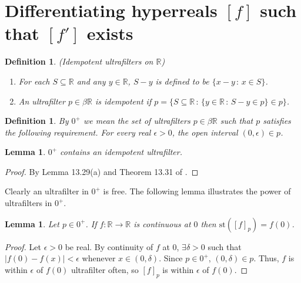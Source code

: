 \documentclass[microtype]{jloganal}
\newtheorem{lemma}[theorem]{Lemma}
\newtheorem{definition}[theorem]{Definition}
\begin{document}
\section{Differentiating hyperreals $[f]$ such that $[f']$ exists}
\label{mainsection}

\begin{definition}
\label{idempotentultrafiltersonRdefn}
(Idempotent ultrafilters on $\mathbb R$)
    \begin{enumerate}
        \item
        For each $S\subseteq \mathbb R$ and any $y\in\mathbb R$,
        $S-y$ is defined to be $\{x-y\,:\,x\in S\}$.
        \item
        An ultrafilter $p\in\beta\mathbb R$ is \emph{idempotent} if
        $p=\{S\subseteq \mathbb R \,:\, \{y\in\mathbb R\,:\,S-y\in p\}\in p\}$.
    \end{enumerate}
\end{definition}

\begin{definition}
    By $0^+$ we mean the set of ultrafilters $p\in\beta\mathbb R$
    such that $p$ satisfies the following requirement.
    For every real $\epsilon>0$, the open interval $(0,\epsilon)\in p$.
\end{definition}

\begin{lemma}
\label{zeroplushasidempotentultrafilterlemma}
    $0^+$ contains an idempotent ultrafilter.
\end{lemma}

\begin{proof}
    By Lemma 13.29(a) and Theorem 13.31 of \cite{hindman2011algebra}.
\end{proof}

Clearly an ultrafilter in $0^+$ is free.
The following lemma illustrates the power of ultrafilters in $0^+$.

\begin{lemma}
\label{neatlemma}
    Let $p\in 0^+$.
    If $f:\mathbb R\to\mathbb R$ is continuous at $0$ then
    $\mathrm{st}([f]_p)=f(0)$.
\end{lemma}

\begin{proof}
    Let $\epsilon>0$ be real. By continuity of $f$ at $0$,
    $\exists\delta>0$ such that $|f(0)-f(x)|<\epsilon$ whenever
    $x\in(0,\delta)$.
    Since $p\in0^+$, $(0,\delta)\in p$.
    Thus, $f$ is within $\epsilon$ of $f(0)$ ultrafilter often,
    so $[f]_p$ is within $\epsilon$ of $f(0)$.
\end{proof}
\end{document}
